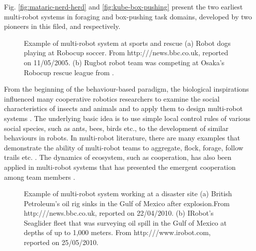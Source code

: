 Fig. \ref{fig:mataric-nerd-herd} and \ref{fig:kube-box-pushing} present the two earliest multi-robot systems in foraging and box-pushing task domains, developed by two pioneers in this filed,  and  respectively.

\begin{figure}[H]
\centering
{} 
\hspace{0.25cm}
\caption{Example of multi-robot system at sports and rescue (a) Robot dogs playing at Robocup soccer. \protect\newline From http:///news.bbc.co.uk, reported on 11/05/2005. 
(b) Rugbot robot team was competing at Osaka's Robocup rescue league from \protect{}.}
\label{fig:robocup}
\end{figure}
From the beginning of the behaviour-based paradigm, the biological inspirations influenced many cooperative robotics researchers to examine the social characteristics of insects and animals and to apply them to design multi-robot systems \cite{Arkin1998}. The underlying basic idea is to use simple local control rules of various social species, such as ants, bees, birds etc., to the development of similar behaviours in robots. In multi-robot literature, there are many examples that demonstrate the ability of multi-robot teams to aggregate, flock, forage, follow trails etc. \cite{Bonabeau+1999}. The dynamics of ecosystem, such as cooperation, has also been applied in multi-robot systems that has presented the emergent cooperation among team members \cite{Mcfarland1994,Martinoli+1996}. 
\begin{figure}[H]
\centering
{} 
\hspace{0.25cm}
\caption{Example of multi-robot system working at a disaster site (a) British Petroleum's oil rig sinks in the Gulf of Mexico after explosion.\protect\newline From http:///news.bbc.co.uk, reported on 22/04/2010. 
(b) IRobot's Seaglider fleet that was surveying oil spill in the Gulf of Mexico at depths of up to 1,000 meters. From http:///www.irobot.com, reported on 25/05/2010.}
\label{fig:bp-oil-disaster}
\end{figure}

